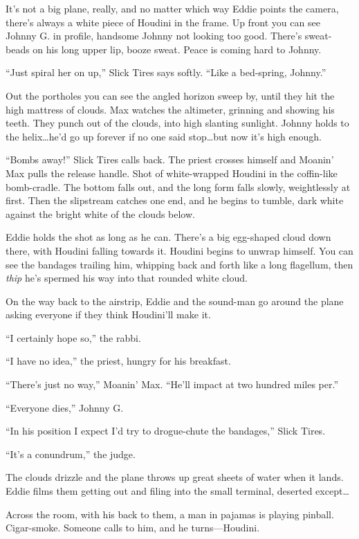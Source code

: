 It's not a big plane, really, and no matter which way Eddie points the camera, there's always a white piece of Houdini in the frame. Up front you can see Johnny G. in profile, handsome Johnny not looking too good. There's sweat-beads on his long upper lip, booze sweat. Peace is coming hard to Johnny.

``Just spiral her on up,'' Slick Tires says softly. ``Like a bed-spring, Johnny.''

Out the portholes you can see the angled horizon sweep by, until they hit the high mattress of clouds. Max watches the altimeter, grinning and showing his teeth. They punch out of the clouds, into high slanting sunlight. Johnny holds to the helix\ldots he'd go up forever if no one said stop\ldots but now it's high enough.

``Bombs away!'' Slick Tires calls back. The priest crosses himself and Moanin' Max pulls the release handle. Shot of white-wrapped Houdini in the coffin-like bomb-cradle. The bottom falls out, and the long form falls slowly, weightlessly at first. Then the slipstream catches one end, and he begins to tumble, dark white against the bright white of the clouds below.

Eddie holds the shot as long as he can. There's a big egg-shaped cloud down there, with Houdini falling towards it. Houdini begins to unwrap himself. You can see the bandages trailing him, whipping back and forth like a long flagellum, then \textit{thip} he's spermed his way into that rounded white cloud.

On the way back to the airstrip, Eddie and the sound-man go around the plane asking everyone if they think Houdini'll make it.

``I certainly hope so,'' the rabbi.

``I have no idea,'' the priest, hungry for his breakfast.

``There's just no way,'' Moanin' Max. ``He'll impact at two hundred miles per.''

``Everyone dies,'' Johnny G.

``In his position I expect I'd try to drogue-chute the bandages,'' Slick Tires.

``It's a conundrum,'' the judge.

The clouds drizzle and the plane throws up great sheets of water when it lands. Eddie films them getting out and filing into the small terminal, deserted except\ldots

Across the room, with his back to them, a man in pajamas is playing pinball. Cigar-smoke. Someone calls to him, and he turns—Houdini.

